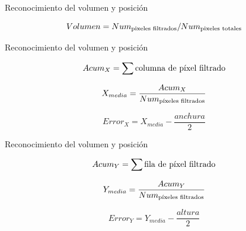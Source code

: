 \documentclass{beamer}
\begin{document}
\begin{frame}{Reconocimiento del volumen y posición}
\begin{alertblock}{}
		\begin{equation*} 
	Volumen = Num_{\textup{pixeles filtrados}}/Num_{\textup{pixeles totales}}
	\end{equation*}
\end{alertblock}
\end{frame}

\begin{frame}{Reconocimiento del volumen y posición}
\begin{alertblock}{}
		\begin{equation*}\label{equation:acumx}
	Acum_{X} = \sum\textup{columna de píxel filtrado}
	\end{equation*}
	
	\begin{equation*}\label{equation:acumx2}
	X_{media} = \frac{Acum_{X}}{Num_{\textup{píxeles filtrados}}}
	\end{equation*}
	
	\begin{equation*}\label{equation:acumx3}
	Error_{X} = X_{media}- \frac{anchura}{2}
	\end{equation*}
\end{alertblock}
\end{frame}


\begin{frame}{Reconocimiento del volumen y posición}
\begin{alertblock}{}
	\begin{equation*}\label{equation:acumy}
	Acum_{Y} = \sum\textup{fila de píxel filtrado}
	\end{equation*}

	\begin{equation*}\label{equation:acumy2}
	Y_{media} = \frac{Acum_{Y}}{Num_{\textup{píxeles filtrados}}}
	\end{equation*}

	\begin{equation*}\label{equation:acumy3}
	Error_{Y} = Y_{media}- \frac{altura}{2}
	\end{equation*}
\end{alertblock}
\end{frame}
\end{document}
